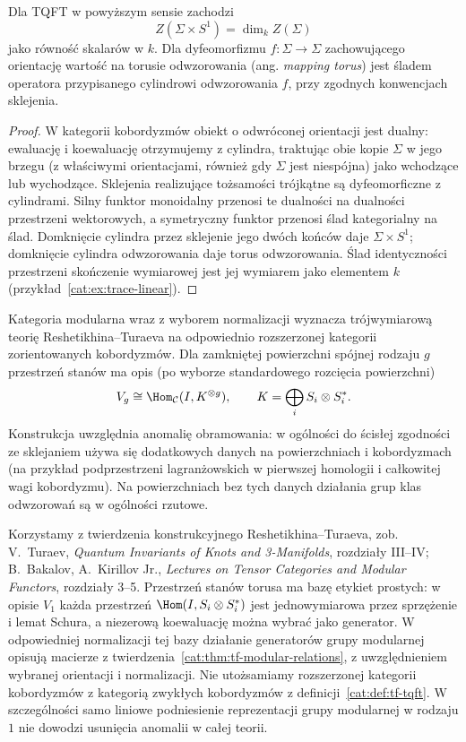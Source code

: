 \begin{stwierdzenie}\label{cat:prop:tf-tqft-trace}
Dla TQFT w powyższym sensie zachodzi
\[
 Z(\Sigma\times S^1)=\dim_k Z(\Sigma)
\]
jako równość skalarów w $k$. Dla dyfeomorfizmu $f:\Sigma\to\Sigma$ zachowującego orientację wartość na torusie odwzorowania (ang. \emph{mapping torus}) jest śladem operatora przypisanego cylindrowi odwzorowania $f$, przy zgodnych konwencjach sklejenia.
\end{stwierdzenie}
\begin{proof}
W kategorii kobordyzmów obiekt o odwróconej orientacji jest dualny: ewaluację i koewaluację otrzymujemy z cylindra, traktując obie kopie $\Sigma$ w jego brzegu (z właściwymi orientacjami, również gdy $\Sigma$ jest niespójna) jako wchodzące lub wychodzące. Sklejenia realizujące tożsamości trójkątne są dyfeomorficzne z cylindrami. Silny funktor monoidalny przenosi te dualności na dualności przestrzeni wektorowych, a symetryczny funktor przenosi ślad kategorialny na ślad. Domknięcie cylindra przez sklejenie jego dwóch końców daje $\Sigma\times S^1$; domknięcie cylindra odwzorowania daje torus odwzorowania. Ślad identyczności przestrzeni skończenie wymiarowej jest jej wymiarem jako elementem $k$ (przykład~\ref{cat:ex:trace-linear}).
\end{proof}

\begin{twierdzenie}\label{cat:thm:tf-rt-tqft}
Kategoria modularna wraz z wyborem normalizacji wyznacza trójwymiarową teorię Reshetikhina--Turaeva na odpowiednio rozszerzonej kategorii zorientowanych kobordyzmów. Dla zamkniętej powierzchni spójnej rodzaju $g$ przestrzeń stanów ma opis (po wyborze standardowego rozcięcia powierzchni)
\[
 V_g\cong \Hom_{\mathcal C}(I,K^{\otimes g}),\qquad
 K=\bigoplus_i S_i\otimes S_i^*.
\]
Konstrukcja uwzględnia anomalię obramowania: w ogólności do ścisłej zgodności ze sklejaniem używa się dodatkowych danych na powierzchniach i kobordyzmach (na przykład podprzestrzeni lagranżowskich w pierwszej homologii i całkowitej wagi kobordyzmu). Na powierzchniach bez tych danych działania grup klas odwzorowań są w ogólności rzutowe.
\end{twierdzenie}

Korzystamy z twierdzenia konstrukcyjnego Reshetikhina--Turaeva, zob. V.~Turaev, \emph{Quantum Invariants of Knots and 3-Manifolds}, rozdziały III--IV; B.~Bakalov, A.~Kirillov Jr., \emph{Lectures on Tensor Categories and Modular Functors}, rozdziały 3--5. Przestrzeń stanów torusa ma bazę etykiet prostych: w opisie $V_1$ każda przestrzeń $\Hom(I,S_i\otimes S_i^*)$ jest jednowymiarowa przez sprzężenie i lemat Schura, a niezerową koewaluację można wybrać jako generator. W odpowiedniej normalizacji tej bazy działanie generatorów grupy modularnej opisują macierze z twierdzenia~\ref{cat:thm:tf-modular-relations}, z uwzględnieniem wybranej orientacji i normalizacji. Nie utożsamiamy rozszerzonej kategorii kobordyzmów z kategorią zwykłych kobordyzmów z definicji~\ref{cat:def:tf-tqft}. W szczególności samo liniowe podniesienie reprezentacji grupy modularnej w rodzaju $1$ nie dowodzi usunięcia anomalii w całej teorii.

